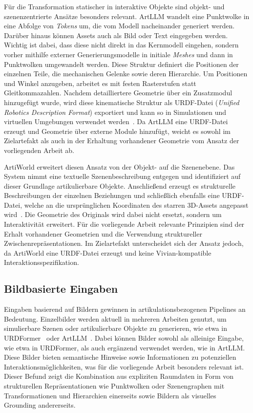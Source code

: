 Für die Transformation statischer in interaktive Objekte sind objekt- und szenenzentrierte Ansätze besonders relevant.
ArtLLM wandelt eine Punktwolke in eine Abfolge von \textit{Tokens} um, die vom Modell nacheinander generiert werden.
Darüber hinaus können Assets auch als Bild oder Text eingegeben werden. Wichtig ist dabei, dass diese nicht direkt in das Kernmodell eingehen, sondern vorher mithilfe externer Generierungsmodelle in initiale \textit{Meshes} und dann in Punktwolken umgewandelt werden.
Diese Struktur definiert die Positionen der einzelnen Teile, die mechanischen Gelenke sowie deren Hierarchie.
Um Positionen und Winkel anzugeben, arbeitet es mit festen Rasterstufen statt Gleitkommazahlen.
Nachdem detailliertere Geometrie über ein Zusatzmodul hinzugefügt wurde, wird diese kinematische Struktur als URDF-Datei (\textit{Unified Robotics Description Format}) exportiert und kann so in Simulationen und virtuellen Umgebungen verwendet werden~\cite{wangArtLLMGeneratingArticulated2026}.
Da ArtLLM eine URDF-Datei erzeugt und Geometrie über externe Module hinzufügt, weicht es sowohl im Zielartefakt als auch in der Erhaltung vorhandener Geometrie vom Ansatz der vorliegenden Arbeit ab.

ArtiWorld erweitert diesen Ansatz von der Objekt- auf die Szenenebene.
Das System nimmt eine textuelle Szenenbeschreibung entgegen und identifiziert auf dieser Grundlage artikulierbare Objekte.
Anschließend erzeugt es strukturelle Beschreibungen der einzelnen Beziehungen und schließlich ebenfalls eine URDF-Datei, welche an die ursprünglichen Koordinaten des starren 3D-Assets angepasst wird~\cite{yangArtiWorldLLMDrivenArticulation2025}.
Die Geometrie des Originals wird dabei nicht ersetzt, sondern um Interaktivität erweitert.
Für die vorliegende Arbeit relevante Prinzipien sind der Erhalt vorhandener Geometrien und die Verwendung struktureller Zwischenrepräsentationen.
Im Zielartefakt unterscheidet sich der Ansatz jedoch, da ArtiWorld eine URDF-Datei erzeugt und keine Vivian-kompatible Interaktionsspezifikation.

\subsection*{Bildbasierte Eingaben}

Eingaben basierend auf Bildern gewinnen in artikulationsbezogenen Pipelines an Bedeutung.
Einzelbilder werden aktuell in mehreren Arbeiten genutzt, um simulierbare Szenen oder artikulierbare Objekte zu generieren, wie etwa in URDFormer~\cite{chenURDFormerPipelineConstructing2024} oder ArtLLM~\cite{wangArtLLMGeneratingArticulated2026}.
Dabei können Bilder sowohl als alleinige Eingabe, wie etwa in URDFormer, als auch ergänzend verwendet werden, wie in ArtLLM.
Diese Bilder bieten semantische Hinweise sowie Informationen zu potenziellen Interaktionsmöglichkeiten, was für die vorliegende Arbeit besonders relevant ist.
Dieser Befund zeigt die Kombination aus expliziten Raumdaten in Form von strukturellen Repräsentationen wie Punktwolken oder Szenengraphen mit Transformationen und Hierarchien einerseits sowie Bildern als visuelles Grounding andererseits.

